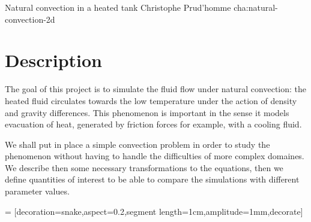             {Natural convection in a heated tank}
            {Christophe Prud'homme}
            {cha:natural-convection-2d}

\newcommand{\Gr}{\ensuremath{\mathrm{Gr}\xspace}}
\renewcommand{\Pr}{\ensuremath{\mathrm{Pr}\xspace}}

\section{Description}
\label{sec:description}

The goal of this project is to simulate the fluid flow under natural
convection: the heated fluid circulates towards the low temperature
under the action of density and gravity differences. This phenomenon
is important in the sense it models evacuation of heat, generated by
friction forces for example, with  a cooling fluid.

We shall put in place a simple convection problem in order to study
the phenomenon without having to handle the difficulties of more
complex domaines. We describe then some necessary transformations to
the equations, then we define quantities of interest to be able to
compare the simulations with different parameter values.


\newcommand{\Water}{\text{\textsc{Water}}\xspace}
\newcommand{\Fluid}{\text{\textsc{Fluid}}\xspace}
 = [decoration={snake,aspect=0.2,segment length=1cm,amplitude=1mm},decorate]

